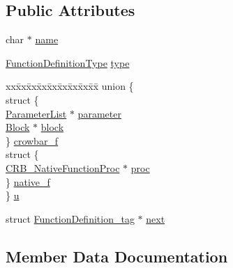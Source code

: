 \subsection*{Public Attributes}
\begin{DoxyCompactItemize}
\item 
char $\ast$ \hyperlink{struct_function_definition__tag_ac86d561cdc103d16dc92445651fbde2f}{name}
\item 
\hyperlink{crowbar_8h_a67222f1cbccd1a26edc686500aa6ea97}{Function\+Definition\+Type} \hyperlink{struct_function_definition__tag_a6477190ea35ab3daa69aa8762e302661}{type}
\item 
\begin{tabbing}
xx\=xx\=xx\=xx\=xx\=xx\=xx\=xx\=xx\=\kill
union \{\\
\>struct \{\\
\>\>\hyperlink{crowbar_8h_a7e7687e26b28e339ebcc8eaab571dcf7}{ParameterList} $\ast$ \hyperlink{struct_function_definition__tag_a920e515da65f6d48e75864181108dba4}{parameter}\\
\>\>\hyperlink{struct_block}{Block} $\ast$ \hyperlink{struct_function_definition__tag_a63493f81a30a92680126bbb0a6331816}{block}\\
\>\} \hyperlink{struct_function_definition__tag_ac903298e1aeddc0d693b5591f3f127e3}{crowbar\_f}\\
\>struct \{\\
\>\>\hyperlink{_c_r_b__dev_8h_af310ef1ce709cc9c2e7d1e3bf43b76ec}{CRB\_NativeFunctionProc} $\ast$ \hyperlink{struct_function_definition__tag_a5178ea679186f4c16f227644e060c350}{proc}\\
\>\} \hyperlink{struct_function_definition__tag_a47669f5b5a90c174a8074dcee352b889}{native\_f}\\
\} \hyperlink{struct_function_definition__tag_a82459859fdf1587b0bf434c5e9c61192}{u}\\

\end{tabbing}\item 
struct \hyperlink{struct_function_definition__tag}{Function\+Definition\+\_\+tag} $\ast$ \hyperlink{struct_function_definition__tag_ab9569f0ddbe305b4c58fdc673f0afd01}{next}
\end{DoxyCompactItemize}


\subsection{Member Data Documentation}
\hypertarget{struct_function_definition__tag_a63493f81a30a92680126bbb0a6331816}{}
